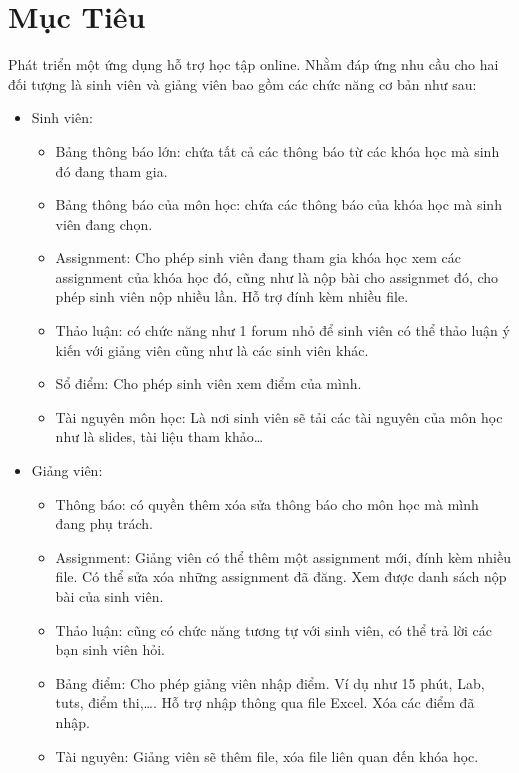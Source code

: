 \documentclass[12pt]{article}
\begin{document}

\renewcommand{\contentsname}{Mục Lục}
\tableofcontents
\pagebreak


\section{Mục Tiêu}
Phát triển một ứng dụng hỗ trợ học tập online. Nhằm đáp ứng nhu cầu cho hai đối tượng là sinh viên và giảng viên bao gồm các chức năng cơ bản như sau:
\begin{itemize}
\item Sinh viên:
 \begin{itemize}
 \item Bảng thông báo lớn: chứa tất cả các thông báo từ các khóa học mà sinh đó đang tham gia.
 \item Bảng thông báo của môn học: chứa các thông báo của khóa học mà sinh viên đang chọn.
 \item Assignment: Cho phép sinh viên đang tham gia khóa học xem các assignment của khóa học đó, cũng như là nộp bài cho assignmet đó, cho phép sinh viên nộp nhiều lần. Hỗ trợ đính kèm nhiều file.
 \item Thảo luận: có chức năng như 1 forum nhỏ để sinh viên có thể thảo luận ý kiến với giảng viên cũng như là các sinh viên khác.
 \item Sổ điểm: Cho phép sinh viên xem điểm của mình.
 \item Tài nguyên môn học: Là nơi sinh viên sẽ tải các tài nguyên của môn học như là slides, tài liệu tham khảo…
 \end{itemize}
\item Giảng viên:
 \begin{itemize}
 \item Thông báo: có quyền thêm xóa sửa thông báo cho môn học mà mình đang phụ trách.
 \item Assignment: Giảng viên có thể thêm một assignment mới, đính kèm nhiều file. Có thể sửa xóa những assignment đã đăng. Xem được danh sách nộp bài của sinh viên.
 \item Thảo luận: cũng có chức năng tương tự với sinh viên, có thể trả lời các bạn sinh viên hỏi.
 \item Bảng điểm: Cho phép giảng viên nhập điểm. Ví dụ như 15 phút, Lab, tuts, điểm thi,…. Hỗ trợ nhập thông qua file Excel. Xóa các điểm đã nhập.
 \item Tài nguyên: Giảng viên sẽ thêm file, xóa file liên quan đến khóa học.
 \end{itemize}
\end{itemize}
\end{document}
